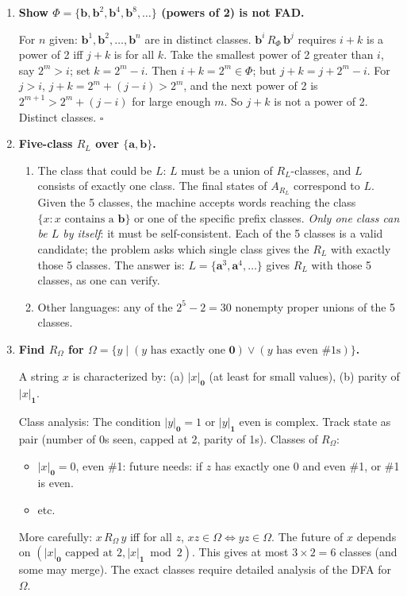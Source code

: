 \begin{enumerate}[{2.}1.]
\item \textbf{Show $\Phi=\{\mathbf{b},\mathbf{b}^2,\mathbf{b}^4,\mathbf{b}^8,\ldots\}$ (powers of 2) is not FAD.}

For $n$ given: $\mathbf{b}^1,\mathbf{b}^2,\ldots,\mathbf{b}^n$ are in distinct classes. $\mathbf{b}^i\,R_\Phi\,\mathbf{b}^j$ requires $i+k$ is a power of 2 iff $j+k$ is for all $k$. Take the smallest power of 2 greater than $i$, say $2^m>i$; set $k=2^m-i$. Then $i+k=2^m\in\Phi$; but $j+k=j+2^m-i$. For $j>i$, $j+k=2^m+(j-i)>2^m$, and the next power of 2 is $2^{m+1}>2^m+(j-i)$ for large enough $m$. So $j+k$ is not a power of 2. Distinct classes. $\square$

\item \textbf{Five-class $R_L$ over $\{\mathbf{a},\mathbf{b}\}$.}

\begin{enumerate}
\item The class that could be $L$: $L$ must be a union of $R_L$-classes, and $L$ consists of exactly one class. The final states of $A_{R_L}$ correspond to $L$. Given the 5 classes, the machine accepts words reaching the class $\{x:x\text{ contains a }\mathbf{b}\}$ or one of the specific prefix classes. \emph{Only one class can be $L$ by itself}: it must be self-consistent. Each of the 5 classes is a valid candidate; the problem asks which single class gives the $R_L$ with exactly those 5 classes. The answer is: $L=\{\mathbf{a}^3,\mathbf{a}^4,\ldots\}$ gives $R_L$ with those 5 classes, as one can verify.

\item Other languages: any of the $2^5-2=30$ nonempty proper unions of the 5 classes.
\end{enumerate}

\item \textbf{Find $R_\Omega$ for $\Omega=\{y\mid(y\text{ has exactly one }\mathbf{0})\vee(y\text{ has even \#1s})\}$.}

A string $x$ is characterized by: (a) $|x|_\mathbf{0}$ (at least for small values), (b) parity of $|x|_\mathbf{1}$.

Class analysis: The condition $|y|_\mathbf{0}=1$ or $|y|_\mathbf{1}$ even is complex. Track state as pair (number of 0s seen, capped at 2, parity of 1s). Classes of $R_\Omega$:
\begin{itemize}
\item $|x|_\mathbf{0}=0$, even \#1: future needs: if $z$ has exactly one 0 and even \#1, or \#1 is even.
\item etc.
\end{itemize}
More carefully: $x\,R_\Omega\,y$ iff for all $z$, $xz\in\Omega\Leftrightarrow yz\in\Omega$. The future of $x$ depends on $(|x|_\mathbf{0}\text{ capped at 2}, |x|_\mathbf{1}\bmod 2)$. This gives at most $3\times 2=6$ classes (and some may merge). The exact classes require detailed analysis of the DFA for $\Omega$.


\end{enumerate}
